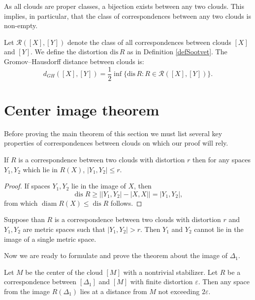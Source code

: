 \documentclass[leqno]{article}
\begin{document}
\begin{remark}
    As all clouds are proper classes, a bijection exists between any
    two clouds. This implies, in particular, that the class of
    correspondences between any two clouds is non-empty.
\end{remark}

\begin{definition}
    Let $\mathcal{R}([X],[Y])$ denote the class of all correspondences
    between clouds $[X]$ and $[Y]$. We define the distortion
    $\text{dis}\, R$ as in Definition \ref{defSootvet}. The
    Gromov--Hausdorff distance between clouds is:
    $$
    d_{GH}([X],[Y]) = \frac{1}{2}\inf\{\text{dis}\, R : R \in
    \mathcal{R}([X],[Y])\}.
    $$
\end{definition}

\section{Center image theorem}

Before proving the main theorem of this section we must list several
key properties of correspondences between clouds on which our proof will rely.
\begin{lemma}\label{lemDiamImage}
    If $R$ is a correspondence between two clouds with distortion $r$
    then for any spaces $Y_1,Y_2$ which lie in $R(X)$, $|Y_1,Y_2| \le r$.
\end{lemma}

\begin{proof}
    If spaces $Y_{1}, Y_{2}$ lie in the image of $X$, then
    $$
    \operatorname{dis} R \geq \big|\left|Y_{1},Y_{2}\right| -
    \left|X,X\right|\big| = |Y_{1}, Y_{2}|,
    $$
    from which $\operatorname{diam} R(X) \leq \operatorname{dis} R$ follows.
\end{proof}

\begin{corollary}
    Suppose than $R$ is a correspondence between two clouds with
    distortion $r$ and $Y_1,Y_2$ are metric spaces such that $|Y_1,Y_2|
    > r$. Then $Y_1$ and $Y_2$ cannot lie in the image of a single metric space.
\end{corollary}
Now we are ready to formulate and prove the theorem about the image
of $\Delta_1$.
\begin{theorem}\label{thrmCenterImage}
    Let $M$ be the center of the cloud $[M]$ with a nontrivial
    stabilizer. Let $R$ be a correspondence between $[\Delta_{1}]$ and
    $[M]$ with finite distortion $\varepsilon$. Then any space from the
    image $R(\Delta_{1})$ lies at a distance from $M$ not exceeding
    $2\varepsilon$.
\end{theorem}
\end{document}
